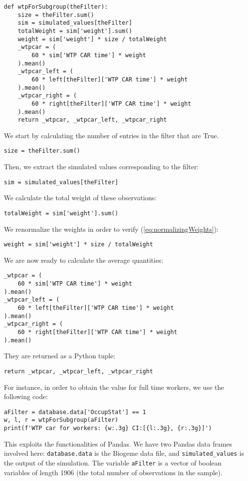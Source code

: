 \documentclass[12pt,a4paper]{article}
\newcommand{\req}[1]{(\ref{#1})}
\begin{document}
\begin{lstlisting}
def wtpForSubgroup(theFilter):
    size = theFilter.sum()
    sim = simulated_values[theFilter]
    totalWeight = sim['weight'].sum()
    weight = sim['weight'] * size / totalWeight
    _wtpcar = (
        60 * sim['WTP CAR time'] * weight
    ).mean()
    _wtpcar_left = (
        60 * left[theFilter]['WTP CAR time'] * weight
    ).mean()
    _wtpcar_right = (
        60 * right[theFilter]['WTP CAR time'] * weight
    ).mean()
    return _wtpcar, _wtpcar_left, _wtpcar_right

\end{lstlisting}

We start by calculating the number of entries in the filter that are
True.
\begin{lstlisting}
size = theFilter.sum()
\end{lstlisting}
Then, we extract the simulated values corresponding to the filter:
\begin{lstlisting}
sim = simulated_values[theFilter]
\end{lstlisting}
We calculate the total weight of these observations:
\begin{lstlisting}
totalWeight = sim['weight'].sum()
\end{lstlisting}
We renormalize the weights in order to verify \req{eq:normalizingWeights}:
\begin{lstlisting}
weight = sim['weight'] * size / totalWeight
\end{lstlisting}
We are now ready to calculate the average quantities:
\begin{lstlisting}
_wtpcar = (
    60 * sim['WTP CAR time'] * weight
).mean()
_wtpcar_left = (
    60 * left[theFilter]['WTP CAR time'] * weight
).mean()
_wtpcar_right = (
    60 * right[theFilter]['WTP CAR time'] * weight
).mean()
\end{lstlisting}
They are returned as a Python tuple:
\begin{lstlisting}
return _wtpcar, _wtpcar_left, _wtpcar_right
\end{lstlisting}

For instance, in order to obtain the value for full time workers, we
use the following code:
\begin{lstlisting}
aFilter = database.data['OccupStat'] == 1
w, l, r = wtpForSubgroup(aFilter)
print(f'WTP car for workers: {w:.3g} CI:[{l:.3g}, {r:.3g}]')
\end{lstlisting}

This exploits the functionalities of Pandas. We have two Pandas data
frames involved here: \lstinline+database.data+ is the Biogeme data
file, and \lstinline+simulated_values+ is the output of the
simulation. The variable \lstinline+aFilter+ is a vector of boolean
variables of length 1906
(the total number of observations in the sample).
\end{document}

